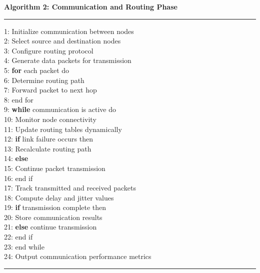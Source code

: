 \documentclass[a4paper,fleqn]{cas-dc}
\numberwithin{equation}{section}
\begin{document}
\textbf{Algorithm 2: Communication and Routing Phase}
\noindent\rule{\linewidth}{0.5pt}
\hspace{0.5cm}1: Initialize communication between nodes \\
\hspace{0.5cm}2: Select source and destination nodes \\
\hspace{0.5cm}3: Configure routing protocol \\
\hspace{0.5cm}4: Generate data packets for transmission \\
\hspace{0.5cm}5: \textbf{for} each packet do \\
\hspace{0.5cm}6: Determine routing path \\
\hspace{0.5cm}7: Forward packet to next hop \\
\hspace{0.5cm}8: end for \\
\hspace{0.5cm}9: \textbf{while} communication is active do \\
\hspace{0.5cm}10: Monitor node connectivity \\
\hspace{0.5cm}11: Update routing tables dynamically \\
\hspace{0.5cm}12: \textbf{if} link failure occurs then \\
\hspace{0.5cm}13: Recalculate routing path \\
\hspace{0.5cm}14: \textbf{else} \\
\hspace{0.5cm}15: Continue packet transmission \\
\hspace{0.5cm}16: end if \\
\hspace{0.5cm}17: Track transmitted and received packets \\
\hspace{0.5cm}18: Compute delay and jitter values \\
\hspace{0.5cm}19: \textbf{if} transmission complete then \\
\hspace{0.5cm}20: Store communication results \\
\hspace{0.5cm}21: \textbf{else} continue transmission \\
\hspace{0.5cm}22: end if \\
\hspace{0.5cm}23: end while \\
\hspace{0.5cm}24: Output communication performance metrics \\
\noindent\rule{\linewidth}{0.5pt}
\end{document}
